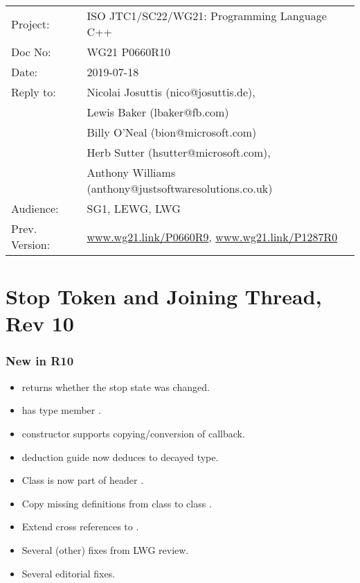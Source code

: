 
{\small
\begin{tabular}{@{}ll}
Project:  	& ISO JTC1/SC22/WG21: Programming Language C++ \\
Doc No: 	& WG21 P0660R10 \\
Date: 		& 2019-07-18 \\
Reply to: 	& Nicolai Josuttis (nico@josuttis.de), \\
                &         Lewis Baker (lbaker@fb.com) \\
                &         Billy O'Neal (bion@microsoft.com) \\
                &         Herb Sutter (hsutter@microsoft.com), \\
                &         Anthony Williams (anthony@justsoftwaresolutions.co.uk) \\
Audience: 	& SG1, LEWG, LWG \\
Prev. Version:	& \url{www.wg21.link/P0660R9}, \url{www.wg21.link/P1287R0} \\
\end{tabular}
}

\section*{{\huge{}Stop Token and Joining Thread, Rev 10}}

\subsubsection*{New in R10}
\begin{itemize}
 \item {} returns whether the stop state was changed.
 \item {} has type member .
 \item {} constructor supports copying/conversion of callback.
 \item {} deduction guide now deduces to decayed type.
 \item Class  is now part of header .
 \item Copy missing definitions from class  to class .
 \item Extend cross references to .
 \item Several (other) fixes from LWG review.
 \item Several editorial fixes.
\end{itemize}

